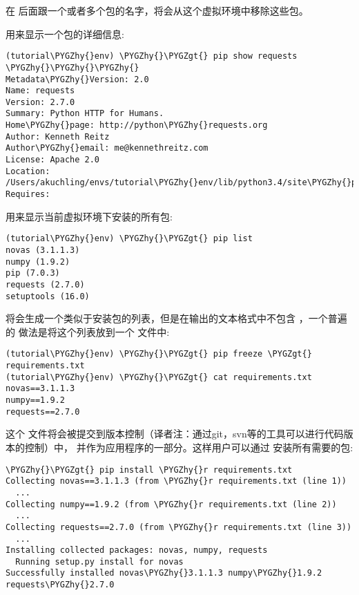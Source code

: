 \documentclass[a4paper,10pt,english]{sphinxmanual}
\def\PYGZgt{\char`\>}
\def\PYGZhy{\char`\-}
\begin{document}
在  后面跟一个或者多个包的名字，将会从这个虚拟环境中移除这些包。

 用来显示一个包的详细信息:

\begin{Verbatim}[commandchars=\\\{\}]
(tutorial\PYGZhy{}env) \PYGZhy{}\PYGZgt{} pip show requests
\PYGZhy{}\PYGZhy{}\PYGZhy{}
Metadata\PYGZhy{}Version: 2.0
Name: requests
Version: 2.7.0
Summary: Python HTTP for Humans.
Home\PYGZhy{}page: http://python\PYGZhy{}requests.org
Author: Kenneth Reitz
Author\PYGZhy{}email: me@kennethreitz.com
License: Apache 2.0
Location: /Users/akuchling/envs/tutorial\PYGZhy{}env/lib/python3.4/site\PYGZhy{}packages
Requires:
\end{Verbatim}

 用来显示当前虚拟环境下安装的所有包:

\begin{Verbatim}[commandchars=\\\{\}]
(tutorial\PYGZhy{}env) \PYGZhy{}\PYGZgt{} pip list
novas (3.1.1.3)
numpy (1.9.2)
pip (7.0.3)
requests (2.7.0)
setuptools (16.0)
\end{Verbatim}

 将会生成一个类似于安装包的列表，但是在输出的文本格式中不包含  ，一个普遍的
做法是将这个列表放到一个  文件中:

\begin{Verbatim}[commandchars=\\\{\}]
(tutorial\PYGZhy{}env) \PYGZhy{}\PYGZgt{} pip freeze \PYGZgt{} requirements.txt
(tutorial\PYGZhy{}env) \PYGZhy{}\PYGZgt{} cat requirements.txt
novas==3.1.1.3
numpy==1.9.2
requests==2.7.0
\end{Verbatim}

这个  文件将会被提交到版本控制（译者注：通过git，svn等的工具可以进行代码版本的控制）中，
并作为应用程序的一部分。这样用户可以通过  安装所有需要的包:

\begin{Verbatim}[commandchars=\\\{\}]
\PYGZhy{}\PYGZgt{} pip install \PYGZhy{}r requirements.txt
Collecting novas==3.1.1.3 (from \PYGZhy{}r requirements.txt (line 1))
  ...
Collecting numpy==1.9.2 (from \PYGZhy{}r requirements.txt (line 2))
  ...
Collecting requests==2.7.0 (from \PYGZhy{}r requirements.txt (line 3))
  ...
Installing collected packages: novas, numpy, requests
  Running setup.py install for novas
Successfully installed novas\PYGZhy{}3.1.1.3 numpy\PYGZhy{}1.9.2 requests\PYGZhy{}2.7.0
\end{Verbatim}
\end{document}
